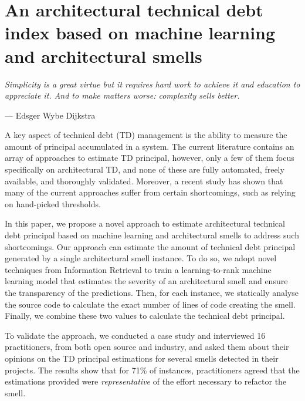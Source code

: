 \setlength{\headheight}{1.2cm}
\renewcommand{\publ}{\flushleft\footnotesize{This chapter has been submitted to a journal.\\[0.1cm]}}

\chapter{An architectural technical debt index based on machine learning and architectural smells}
\label{chap:6}
\epigraph{\emph{Simplicity is a great virtue but it requires hard work to achieve it and education to appreciate it. And to make matters worse: complexity sells better.}}{--- Edsger Wybe Dijkstra}

\begin{Abstract}
	A key aspect of technical debt (TD) management is the ability to measure the amount of principal accumulated in a system.
    The current literature contains an array of approaches to estimate TD principal, however, only a few of them focus specifically on architectural TD, and none of these are fully automated, freely available, and thoroughly validated.
    Moreover, a recent study has shown that many of the current approaches suffer from certain shortcomings, such as relying on hand-picked thresholds.
    
    In this paper, we propose a novel approach to estimate architectural technical debt principal based on machine learning and architectural smells to address such shortcomings.
    Our approach can estimate the amount of technical debt principal generated by a single architectural smell instance.
    To do so, we adopt novel techniques from Information Retrieval to train a learning-to-rank machine learning model that estimates the severity of an architectural smell and ensure the transparency of the predictions.
    Then, for each instance, we statically analyse the source code to calculate the exact number of lines of code creating the smell.
    Finally, we combine these two values to calculate the technical debt principal.
    
    To validate the approach, we conducted a case study and interviewed 16 practitioners, from both open source and industry, and asked them about their opinions on the TD principal estimations for several smells detected in their projects.
    The results show that for 71\% of instances, practitioners agreed that the estimations provided were \emph{representative} of the effort necessary to refactor the smell.
\end{Abstract}

